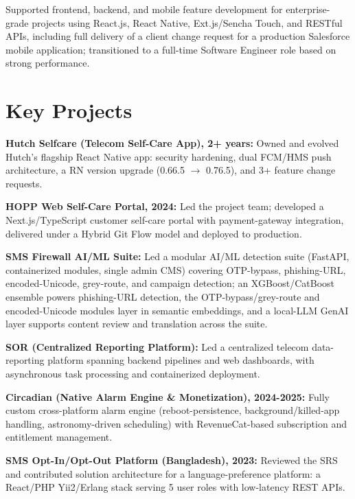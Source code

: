 \documentclass[10.5pt]{article}
\begin{document}
\begin{cvitems}
  \item Supported frontend, backend, and mobile feature development for enterprise-grade projects using React.js, React Native, Ext.js/Sencha Touch, and RESTful APIs, including full delivery of a client change request for a production Salesforce mobile application; transitioned to a full-time Software Engineer role based on strong performance.
\end{cvitems}

\section*{Key Projects}
\begin{cvitems}
  \item \textbf{Hutch Selfcare (Telecom Self-Care App), 2+ years:} Owned and evolved Hutch's flagship React Native app: security hardening, dual FCM/HMS push architecture, a RN version upgrade (0.66.5 $\rightarrow$ 0.76.5), and 3+ feature change requests.
  \item \textbf{HOPP Web Self-Care Portal, 2024:} Led the project team; developed a Next.js/TypeScript customer self-care portal with payment-gateway integration, delivered under a Hybrid Git Flow model and deployed to production.
  \item \textbf{SMS Firewall AI/ML Suite:} Led a modular AI/ML detection suite (FastAPI, containerized modules, single admin CMS) covering OTP-bypass, phishing-URL, encoded-Unicode, grey-route, and campaign detection; an XGBoost/CatBoost ensemble powers phishing-URL detection, the OTP-bypass/grey-route and encoded-Unicode modules layer in semantic embeddings, and a local-LLM GenAI layer supports content review and translation across the suite.
  \item \textbf{SOR (Centralized Reporting Platform):} Led a centralized telecom data-reporting platform spanning backend pipelines and web dashboards, with asynchronous task processing and containerized deployment.
  \item \textbf{Circadian (Native Alarm Engine \& Monetization), 2024-2025:} Fully custom cross-platform alarm engine (reboot-persistence, background/killed-app handling, astronomy-driven scheduling) with RevenueCat-based subscription and entitlement management.
  \item \textbf{SMS Opt-In/Opt-Out Platform (Bangladesh), 2023:} Reviewed the SRS and contributed solution architecture for a language-preference platform: a React/PHP Yii2/Erlang stack serving 5 user roles with low-latency REST APIs.
\end{cvitems}
\end{document}
